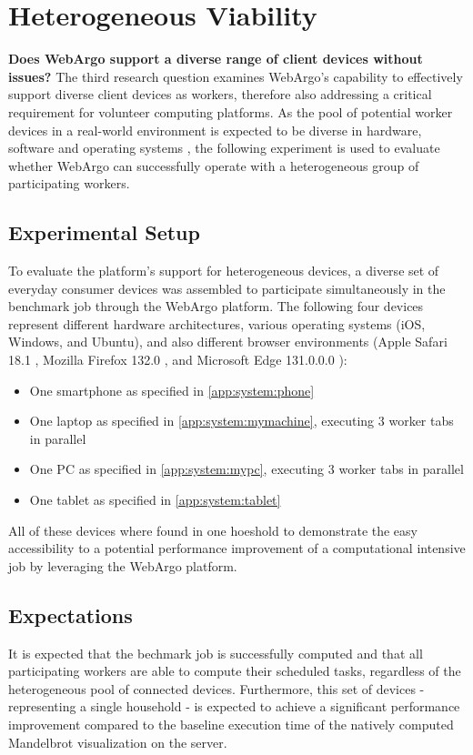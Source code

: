\section{Heterogeneous Viability}
\label{sec:evaluation:heterogen}
\textbf{Does WebArgo support a diverse range of client devices without issues?}
The third research question examines WebArgo's capability to effectively support diverse client devices as workers, therefore also addressing a critical requirement for volunteer computing platforms. As the pool of potential worker devices in a real-world environment is expected to be diverse in hardware, software and operating systems \cite{intro:diverseDevices}, the following experiment is used to evaluate whether WebArgo can successfully operate with a heterogeneous group of participating workers.

\subsection{Experimental Setup}
To evaluate the platform's support for heterogeneous devices, a diverse set of everyday consumer devices was assembled to participate simultaneously in the benchmark job through the WebArgo platform. The following four devices represent different hardware architectures, various operating systems (iOS, Windows, and Ubuntu), and also different browser environments (Apple Safari 18.1 \cite{evaluation:safari}, Mozilla Firefox 132.0 \cite{background:firefox}, and Microsoft Edge 131.0.0.0 \cite{evaluation:edge}):
\begin{itemize}
    \item One smartphone as specified in \autoref{app:system:phone}
    \item One laptop as specified in \autoref{app:system:mymachine}, executing 3 worker tabs in parallel
    \item One \acs{PC} as specified in \autoref{app:system:mypc}, executing 3 worker tabs in parallel
    \item One tablet as specified in \autoref{app:system:tablet}
\end{itemize}
All of these devices where found in one hoeshold to demonstrate the easy accessibility to a potential performance improvement of a computational intensive job by leveraging the WebArgo platform.

\subsection{Expectations}
It is expected that the bechmark job is successfully computed and that all participating workers are able to compute their scheduled tasks, regardless of the heterogeneous pool of connected devices. Furthermore, this set of devices - representing a single household - is expected to achieve a significant performance improvement compared to the baseline execution time of the natively computed Mandelbrot visualization on the server.  

